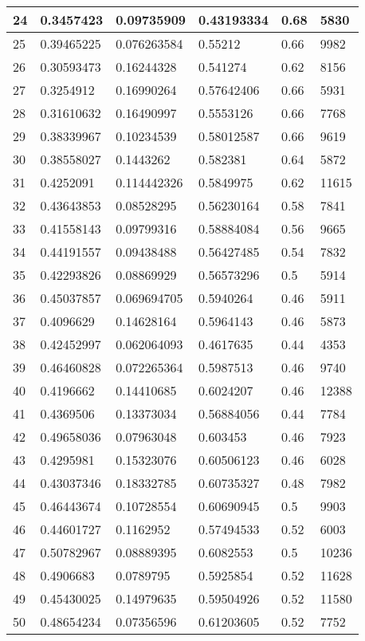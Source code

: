 \begin{longtable}{|l|l|l|l|l|l|}
24 & 0.3457423 & 0.09735909 & 0.43193334 & 0.68 & 5830 \\ \hline 
25 & 0.39465225 & 0.076263584 & 0.55212 & 0.66 & 9982 \\ \hline 
26 & 0.30593473 & 0.16244328 & 0.541274 & 0.62 & 8156 \\ \hline 
27 & 0.3254912 & 0.16990264 & 0.57642406 & 0.66 & 5931 \\ \hline 
28 & 0.31610632 & 0.16490997 & 0.5553126 & 0.66 & 7768 \\ \hline 
29 & 0.38339967 & 0.10234539 & 0.58012587 & 0.66 & 9619 \\ \hline 
30 & 0.38558027 & 0.1443262 & 0.582381 & 0.64 & 5872 \\ \hline 
31 & 0.4252091 & 0.114442326 & 0.5849975 & 0.62 & 11615 \\ \hline 
32 & 0.43643853 & 0.08528295 & 0.56230164 & 0.58 & 7841 \\ \hline 
33 & 0.41558143 & 0.09799316 & 0.58884084 & 0.56 & 9665 \\ \hline 
34 & 0.44191557 & 0.09438488 & 0.56427485 & 0.54 & 7832 \\ \hline 
35 & 0.42293826 & 0.08869929 & 0.56573296 & 0.5 & 5914 \\ \hline 
36 & 0.45037857 & 0.069694705 & 0.5940264 & 0.46 & 5911 \\ \hline 
37 & 0.4096629 & 0.14628164 & 0.5964143 & 0.46 & 5873 \\ \hline 
38 & 0.42452997 & 0.062064093 & 0.4617635 & 0.44 & 4353 \\ \hline 
39 & 0.46460828 & 0.072265364 & 0.5987513 & 0.46 & 9740 \\ \hline 
40 & 0.4196662 & 0.14410685 & 0.6024207 & 0.46 & 12388 \\ \hline 
41 & 0.4369506 & 0.13373034 & 0.56884056 & 0.44 & 7784 \\ \hline 
42 & 0.49658036 & 0.07963048 & 0.603453 & 0.46 & 7923 \\ \hline 
43 & 0.4295981 & 0.15323076 & 0.60506123 & 0.46 & 6028 \\ \hline 
44 & 0.43037346 & 0.18332785 & 0.60735327 & 0.48 & 7982 \\ \hline 
45 & 0.46443674 & 0.10728554 & 0.60690945 & 0.5 & 9903 \\ \hline 
46 & 0.44601727 & 0.1162952 & 0.57494533 & 0.52 & 6003 \\ \hline 
47 & 0.50782967 & 0.08889395 & 0.6082553 & 0.5 & 10236 \\ \hline 
48 & 0.4906683 & 0.0789795 & 0.5925854 & 0.52 & 11628 \\ \hline 
49 & 0.45430025 & 0.14979635 & 0.59504926 & 0.52 & 11580 \\ \hline 
50 & 0.48654234 & 0.07356596 & 0.61203605 & 0.52 & 7752 \\ \hline 
\end{longtable}